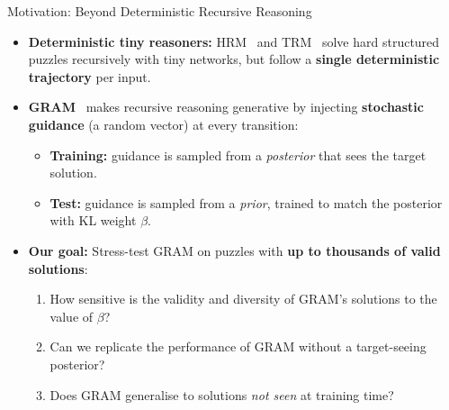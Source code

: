 \documentclass[aspectratio=169,10pt]{beamer}
\begin{document}
\begin{frame}{Motivation: Beyond Deterministic Recursive Reasoning}
  \small
  \begin{itemize}\setlength{\itemsep}{0.3em}
    \item \textbf{Deterministic tiny reasoners:} HRM~\cite{wang2025} and TRM~\cite{jolicoeur2025} solve hard structured puzzles recursively with tiny networks, but follow a \textbf{single deterministic trajectory} per input.
    \item \textbf{GRAM}~\cite{baek2026} makes recursive reasoning generative by injecting \textbf{stochastic guidance} (a random vector) at every transition:
      \begin{itemize}\setlength{\itemsep}{0.15em}
        \item \textbf{Training:} guidance is sampled from a \emph{posterior} that sees the target solution.
        \item \textbf{Test:} guidance is sampled from a \emph{prior}, trained to match the posterior with KL weight $\beta$.
      \end{itemize}
    \item \textbf{Our goal:} Stress-test GRAM on puzzles with \textbf{up to thousands of valid solutions}:
      \begin{enumerate}\setlength{\itemsep}{0.15em}
        \item How sensitive is the validity and diversity of GRAM's solutions to the value of $\beta$?
        \item Can we replicate the performance of GRAM without a target-seeing posterior?
        \item Does GRAM generalise to solutions \emph{not seen} at training time?
      \end{enumerate}
  \end{itemize}
\end{frame}
\end{document}
